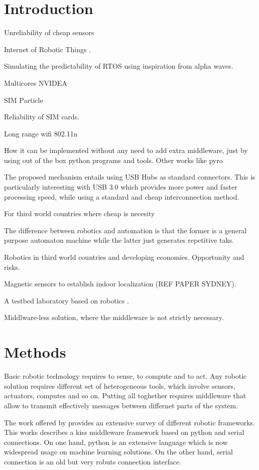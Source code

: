 \section{Introduction}
\label{intro}
Unreliability of cheap sensors


Internet of Robotic Things \cite{Simoens2018}.

Simulating the predictability of RTOS using inspiration from alpha waves.

Multicores NVIDEA 

SIM Particle

Reliability of SIM cards.

Long range wifi 802.11n

How it can be implemented without any need to add extra middleware, just by using out of the box python programs and tools.  Other works like pyro

The proposed mechanism entails using USB Hubs as standard connectors.  This is particularly interesting with USB 3.0 which provides more power and faster processing speed, while using a standard and cheap interconnection method.

For third world countries where cheap is necesity 

The difference between robotics and automation is that the former is a general purpose automaton machine while the latter just generates repetitive taks.

Robotics in third world countries and developing economies.  Opportunity and risks.

Magnetic sensors to establish indoor localization (REF PAPER SYDNEY).

A testbed laboratory based on robotics \cite{Hamblen2013}.


Middlware-less solution, where the middleware is not strictly necessary.
\section{Methods}
\label{sec:1}
Basic robotic technology requires to sense, to compute and to act.  
Any robotic solution requires different set of heterogeneous tools, which involve sensors, actuators, computes and so on.  Putting all toghether requires middleware that allow to transmit effectively messages between differnet parts of the system.

The work offered by \cite{Elkady2012} provides an extensive survey of different robotic frameworks.  This works describes a kiss middleware framework based on python and serial connections.   On one hand, python is an extensive language which is now widespread usage on machine learning solutions.  On the other hand, serial connection is an old but very robuts connection interface.

